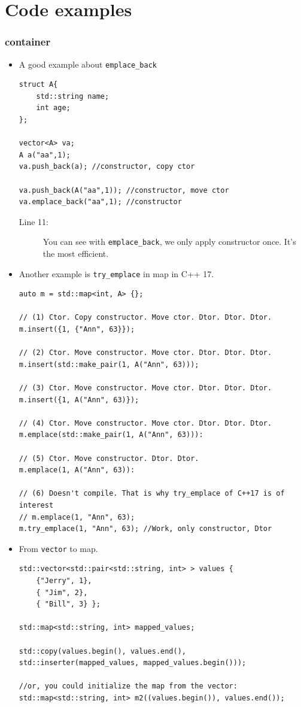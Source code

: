 \documentclass[a4paper,11pt,twoside]{book}
\begin{document}
\section{Code examples}
\subsubsection{container}
\begin{itemize}
\item A good example about \texttt{emplace\_back}
\begin{lstlisting}
struct A{
	std::string name;
	int age;
};

vector<A> va;
A a("aa",1);
va.push_back(a); //constructor, copy ctor

va.push_back(A("aa",1)); //constructor, move ctor
va.emplace_back("aa",1); //constructor 
\end{lstlisting}
\begin{description}
\item[Line 11: ] You can see with \texttt{emplace\_back}, we only apply constructor once. It's the most efficient.
\end{description}

\item Another example is \texttt{try\_emplace} in map in C++ 17.

\begin{lstlisting}
auto m = std::map<int, A> {};
 
// (1) Ctor. Copy constructor. Move ctor. Dtor. Dtor. Dtor.
m.insert({1, {"Ann", 63}});
 
// (2) Ctor. Move constructor. Move ctor. Dtor. Dtor. Dtor.
m.insert(std::make_pair(1, A("Ann", 63)));
 
// (3) Ctor. Move constructor. Move ctor. Dtor. Dtor. Dtor.
m.insert({1, A("Ann", 63)});
 
// (4) Ctor. Move constructor. Move ctor. Dtor. Dtor. Dtor.
m.emplace(std::make_pair(1, A("Ann", 63))):
 
// (5) Ctor. Move constructor. Dtor. Dtor.
m.emplace(1, A("Ann", 63)):
 
// (6) Doesn't compile. That is why try_emplace of C++17 is of interest
// m.emplace(1, "Ann", 63);
m.try_emplace(1, "Ann", 63); //Work, only constructor, Dtor
\end{lstlisting}

\item From \texttt{vector} to map.

\begin{lstlisting}
std::vector<std::pair<std::string, int> > values {   
	{"Jerry", 1},
	{ "Jim", 2},
	{ "Bill", 3} };

std::map<std::string, int> mapped_values;

std::copy(values.begin(), values.end(), 
std::inserter(mapped_values, mapped_values.begin()));

//or, you could initialize the map from the vector:
std::map<std::string, int> m2((values.begin()), values.end());
\end{lstlisting}
\end{itemize}
\end{document}
